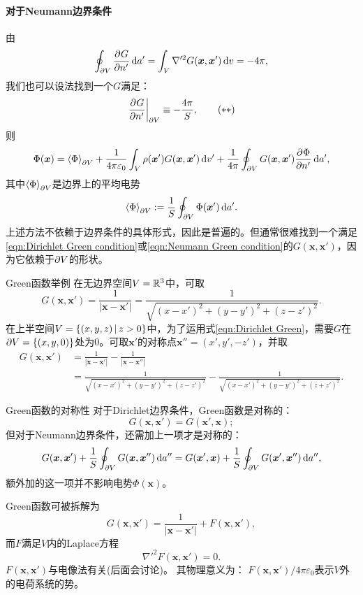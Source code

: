\paragraph{对于Neumann边界条件}由
\[
    \oint_{\partial V}\frac{\partial^{{}}G}{\partial{n'}^{{}}}\mathop{}\!\mathrm{d} a'=\int_V\nabla'^2G(\bm x,\bm x')\mathop{}\!\mathrm{d} v=-4\pi,
\]
我们也可以设法找到一个$G$满足：
\begin{equation}
    \label{eqn:Neumann Green condition}
    \left.\frac{\partial^{{}}G}{\partial{n'}^{{}}}\right\rvert_{\partial V}\equiv-\frac{4\pi}S,\tag{$\ast\ast$}
\end{equation}
则
\begin{align}
    \label{eqn:Neumann Green}
    \Phi(\bm x)=\left\langle \Phi\right\rangle_{\partial V}+\frac1{4\pi\varepsilon_0}\int_V\rho(\bm x')G(\bm x,\bm x')\mathop{}\!\mathrm{d} v'+\frac1{4\pi}\oint_{\partial V}G(\bm x,\bm x')\frac{\partial^{{}}\Phi}{\partial{n'}^{{}}}\mathop{}\!\mathrm{d} a',
\end{align}
其中$\left\langle \Phi\right\rangle_{\partial V}$是边界上的平均电势
\[
    \left\langle \Phi\right\rangle_{\partial V}:=\frac1S\oint_{\partial V}\Phi(\bm x')\mathop{}\!\mathrm{d} a'.
\]
上述方法不依赖于边界条件的具体形式，因此是普遍的。但通常很难找到一个满足\eqref{eqn:Dirichlet Green condition}或\eqref{eqn:Neumann Green condition}的$G(\bm x, \bm x')$，因为它依赖于$\partial V$的形状。
\begin{example}{Green函数举例}{}
    在无边界空间$V=\mathbb R^3$中，可取
    \[
        G(\bm x,\bm x')=\frac1{|\bm x-\bm x'|}=\frac1{\sqrt{(x-x')^2+(y-y')^2+(z-z')^2}}.
    \]
    在上半空间$V=\left\{(x,y,z)\,\middle\vert\,z>0\right\}$中，为了运用式\eqref{eqn:Dirichlet Green}，需要$G$在$\partial V=\{(x,y,0)\}$处为0。可取$\bm x'$的对称点$\bm x''=(x',y',-z')$，并取
    \begin{align*}
        G(\bm x,\bm x')&=\frac1{|\bm x-\bm x'|}-\frac1{|\bm x-\bm x''|}\\
        &=\frac1{\sqrt{(x-x')^2+(y-y')^2+(z-z')^2}}-\frac1{\sqrt{(x-x')^2+(y-y')^2+(z+z')^2}}.
    \end{align*}
\end{example}
\begin{theorem}
    {Green函数的对称性}{}
    对于Dirichlet边界条件，Green函数是对称的：
    \[
        G(\bm x,\bm x')=G(\bm x',\bm x);
    \]
    但对于Neumann边界条件，还需加上一项才是对称的：
    \[
        G(\bm x,\bm x')+\frac1S\oint_{\partial V}G(\bm x,\bm x'')\mathop{}\!\mathrm{d} a''=G(\bm x',\bm x)+\frac1S\oint_{\partial V}G(\bm x',\bm x'')\mathop{}\!\mathrm{d} a'',
    \]
    额外加的这一项并不影响电势$\Phi(\bm x)$。
\end{theorem}
Green函数可被拆解为
\[
    G(\bm x,\bm x')=\frac1{|\bm x-\bm x'|}+F(\bm x,\bm x'),
\]
而$F$满足$V$内的Laplace方程
\[
    \nabla'^2F(\bm x,\bm x')=0.
\]
$F(\bm x, \bm x')$与电像法有关(后面会讨论)。
其物理意义为：
$F(\bm x, \bm x')/4\pi\varepsilon_0$表示$V$外的电荷系统的势。

